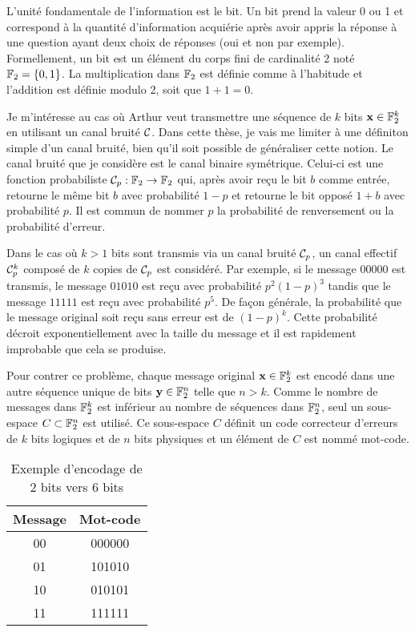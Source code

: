 L'unité fondamentale de l'information est le bit.
Un bit prend la valeur 0 ou 1 et correspond à la quantité 
d'information acquiérie après avoir appris la réponse 
à une question ayant deux choix de réponses (oui et non par exemple).
Formellement, un bit est un élément du corps fini de cardinalité 2 noté $\mathbb{F}_{2} = \qty{0, 1}$.
La multiplication dans $\mathbb{F}_{2}$ est définie comme à l'habitude
et l'addition est définie modulo 2, soit que $1 + 1 = 0$.

Je m'intéresse au cas où Arthur veut transmettre une séquence 
de $k$ bits $\vb{x} \in \mathbb{F}_{2}^k$ en utilisant un canal bruité $\mathcal{C}$.
Dans cette thèse,
je vais me limiter à une définiton simple d'un canal bruité,
bien qu'il soit possible de généraliser cette notion. 
Le canal bruité que je considère est le canal binaire symétrique.
Celui-ci est une fonction probabiliste $\mathcal {\mathcal{C}}_p: \mathbb{F}_{2} \to \mathbb{F}_{2}$
qui, après avoir reçu le bit $b$ comme entrée, 
retourne le même bit $b$ avec probabilité $1 - p$ et retourne le
bit opposé $1 + b$ avec probabilité $p$.
Il est commun de nommer $p$ la probabilité de renversement 
ou la probabilité d'erreur.

Dans le cas où $k > 1$ bits sont transmis via un canal bruité $\mathcal{C}_p$,
un canal effectif $\mathcal{C}_p^k$ composé de $k$ copies de $\mathcal{C}_p$
est considéré.
Par exemple,
si le message $00000$ est transmis,
le message $01010$ est reçu avec probabilité $p^2(1 - p)^3$ 
tandis que le message $11111$ est reçu avec probabilité $p^5$.
De façon générale, 
la probabilité que le message original soit reçu sans erreur est de $(1 - p)^k$.
Cette probabilité décroit exponentiellement avec la taille du message 
et il est rapidement improbable que cela se produise.

Pour contrer ce problème,
chaque message original $\vb x \in \mathbb{F}_{2}^k$ est encodé dans une autre séquence 
unique de bits $\vb{y} \in \mathbb{F}_{2}^n$ telle que $n > k$.
Comme le nombre de messages dans $\mathbb{F}_{2}^k$ est inférieur au nombre
de séquences dans $\mathbb{F}_{2}^n$,
seul un sous-espace $C \subset \mathbb{F}_{2}^n$ est utilisé.
Ce sous-espace $C$ définit un code correcteur d'erreurs
de $k$ bits logiques et de $n$ bits physiques 
et un élément de $C$ est nommé mot-code.

\begin{table}[t]
  \caption{Exemple d'encodage de 2 bits vers 6 bits}
  \label{tab:exemple_encodage}
  \begin{center}
    \begin{tabular}[c]{cc}
      \textbf{Message} & \textbf{Mot-code} \\
      \hline
      00 & 000000 \\
      01 & 101010 \\
      10 & 010101 \\
      11 & 111111
    \end{tabular}
  \end{center}
\end{table}

